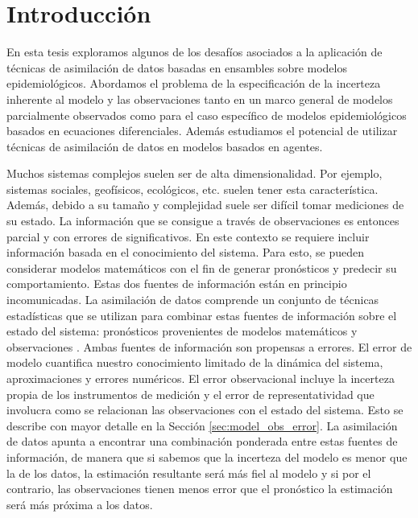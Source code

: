 \chapter{Introducción}
En esta tesis exploramos algunos de los desafíos asociados a la aplicación de técnicas de asimilación de datos basadas en ensambles sobre modelos epidemiológicos. Abordamos el problema de la especificación de la incerteza inherente al modelo y las observaciones tanto en un marco general de modelos parcialmente observados como para el caso específico de modelos epidemiológicos basados en ecuaciones diferenciales. Además estudiamos el potencial de utilizar técnicas de asimilación de datos en modelos basados en agentes.

Muchos sistemas complejos suelen ser de alta dimensionalidad. Por ejemplo, sistemas sociales, geofísicos, ecológicos, etc. suelen tener esta característica. Además, debido a su tamaño y complejidad suele ser difícil tomar mediciones de su estado. La información que se consigue a través de observaciones es entonces parcial y con errores de significativos. En este contexto se requiere incluir información basada en el conocimiento del sistema. Para esto, se pueden considerar modelos matemáticos con el fin de generar pronósticos y predecir su comportamiento. Estas dos fuentes de información están en principio incomunicadas. La asimilación de datos comprende un conjunto de técnicas estadísticas que se utilizan para combinar estas fuentes de información sobre el estado del sistema: pronósticos provenientes de modelos matemáticos y observaciones \citep{Kalnay2003}. Ambas fuentes de información son propensas a errores. El error de modelo cuantifica nuestro conocimiento limitado de la dinámica del sistema, aproximaciones y errores numéricos. El error observacional incluye la incerteza propia de los instrumentos de medición y el error de representatividad que involucra como se relacionan las observaciones con el estado del sistema. Esto se describe con mayor detalle en la Sección \ref{sec:model_obs_error}. La asimilación de datos apunta a encontrar una combinación ponderada entre estas fuentes de información, de manera que si sabemos que la incerteza del modelo es menor que la de los datos, la estimación resultante será más fiel al modelo y si por el contrario, las observaciones tienen menos error que el pronóstico la estimación será más próxima a los datos.

